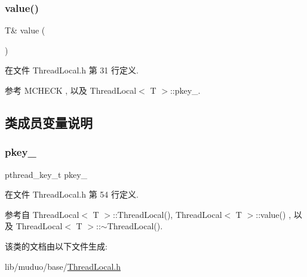 \subsubsection{\texorpdfstring{value()}{value()}}
{\footnotesize\ttfamily T\& value (\begin{DoxyParamCaption}{ }\end{DoxyParamCaption})\hspace{0.3cm}{\ttfamily [inline]}}



在文件 Thread\+Local.\+h 第 31 行定义.



参考 M\+C\+H\+E\+CK , 以及 Thread\+Local$<$ T $>$\+::pkey\+\_\+.



\subsection{类成员变量说明}
\mbox{\label{classmuduo_1_1ThreadLocal_a10ef6ab4122ca7977f07a8c475f54017}} 
\subsubsection{\texorpdfstring{pkey\+\_\+}{pkey\_}}
{\footnotesize\ttfamily pthread\+\_\+key\+\_\+t pkey\+\_\+\hspace{0.3cm}{\ttfamily [private]}}



在文件 Thread\+Local.\+h 第 54 行定义.



参考自 Thread\+Local$<$ T $>$\+::\+Thread\+Local(), Thread\+Local$<$ T $>$\+::value() , 以及 Thread\+Local$<$ T $>$\+::$\sim$\+Thread\+Local().



该类的文档由以下文件生成\+:\begin{DoxyCompactItemize}
\item 
lib/muduo/base/\hyperlink{ThreadLocal_8h}{Thread\+Local.\+h}\end{DoxyCompactItemize}
